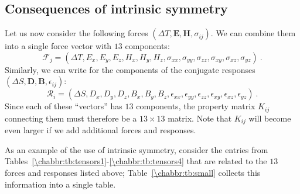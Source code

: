 \subsection{Consequences of intrinsic symmetry}
Let us now consider the following forces $(\Delta T,\mathbf{E},\mathbf{H},\sigma_{ij})$. We can combine them into a single force vector with $13$ components:
\begin{equation}
	\mathcal{F}_j = (\Delta T, E_x, E_y, E_z, H_x, H_y, H_z, \sigma_{xx},\sigma_{yy},\sigma_{zz},\sigma_{xy},\sigma_{xz},
	\sigma_{yz})\ .
\end{equation}
Similarly, we can write for the components of the conjugate responses $(\Delta S,\mathbf{D},\mathbf{B},\epsilon_{ij})$:
\begin{equation}
	\mathcal{R}_i = (\Delta S,D_x,D_y,D_z,B_x,B_y,B_z,\epsilon_{xx},\epsilon_{yy},\epsilon_{zz},\epsilon_{xy},\epsilon_{xz},
	\epsilon_{yz})\ .
\end{equation}
Since each of these ``vectors'' has $13$ components, the property matrix $K_{ij}$ connecting them must therefore be a $13\times 13$ matrix.  Note that $K_{ij}$ will become even larger if we add additional forces and responses.

As an example of the use of intrinsic symmetry, consider the entries from Tables~\ref{\chabbr:tb:tensors1}-\ref{\chabbr:tb:tensors4} that are related to the $13$ forces and responses listed above; Table~\ref{\chabbr:tb:small} collects this information into a single table.  


